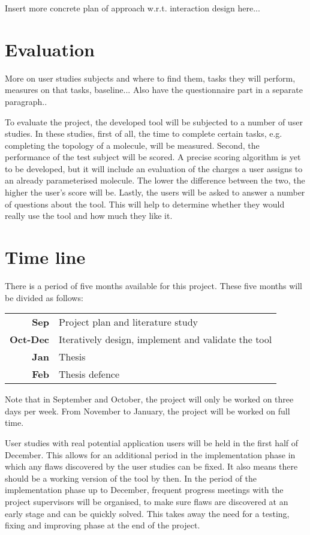 Insert more concrete plan of approach w.r.t. interaction design here...


\section{Evaluation}

More on user studies subjects and where to find them, tasks they will perform, measures on that tasks, baseline... Also have the questionnaire part in a separate paragraph..

To evaluate the project, the developed tool will be subjected to a number of user studies. In these studies, first of all, the time to complete certain tasks, e.g. completing the topology of a molecule, will be measured. Second, the performance of the test subject will be scored. A precise scoring algorithm is yet to be developed, but it will include an evaluation of the charges a user assigns to an already parameterised molecule. The lower the difference between the two, the higher the user's score will be. Lastly, the users will be asked to answer a number of questions about the tool. This will help to determine whether they would really use the tool and how much they like it.


\section{Time line}

There is a period of five months available for this project. These five months will be divided as follows:

\noindent
\begin{tabular}{r|l}
\textbf{Sep} & Project plan and literature study\\
\textbf{Oct-Dec} & Iteratively design, implement and validate the tool\\
\textbf{Jan} & Thesis\\
\textbf{Feb} & Thesis defence
\end{tabular}

\noindent
Note that in September and October, the project will only be worked on three days per week. From November to January, the project will be worked on full time.

User studies with real potential application users will be held in the first half of December. This allows for an additional period in the implementation phase in which any flaws discovered by the user studies can be fixed. It also means there should be a working version of the tool by then. In the period of the implementation phase up to December, frequent progress meetings with the project supervisors will be organised, to make sure flaws are discovered at an early stage and can be quickly solved. This takes away the need for a testing, fixing and improving phase at the end of the project.
